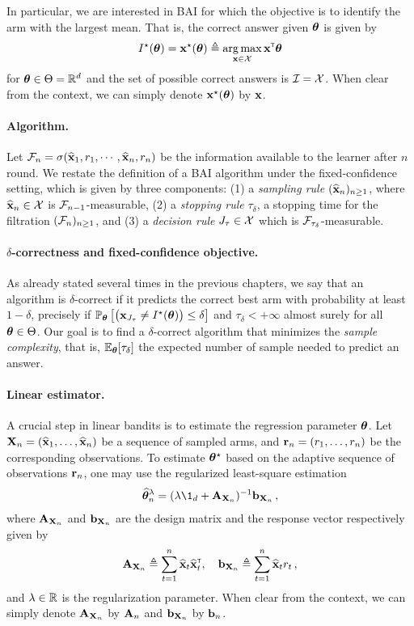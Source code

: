 In particular, we are interested in BAI for which the objective is to identify the arm with the largest mean. That is, the correct answer given ${\boldsymbol \theta}$ is given by 
\[
I^\star({\boldsymbol \theta}) = {\bf x}^\star({\boldsymbol \theta}) \triangleq \operatorname*{arg\,max}_{{\bf x}\in\mathcal{X}} {\bf x}^\mathsf{\scriptscriptstyle T}{\boldsymbol \theta}
\]
for ${\boldsymbol \theta}\in\Theta = \mathbb{R}^d$ and the set of possible correct answers is $\mathcal{I} = \mathcal{X}$. When clear from the context, we can simply denote ${\bf x}^\star({\boldsymbol \theta})$ by ${\bf x}$.

\paragraph{Algorithm.}
Let $\mathcal{F}_{n}=\sigma (\widehat{{\bf x}}_1,r_1,\cdots, \widehat{{\bf x}}_n,r_n)$ be the information available to the learner after $n$ round. We restate the definition of a BAI algorithm under the fixed-confidence setting, which is given by three components: (1) a \emph{sampling rule} $(\widehat{{\bf x}}_n)_{n\geq 1}$, where $\widehat{{\bf x}}_n\in\mathcal{X}$ is $\mathcal{F}_{n-1}$-measurable, (2) a \emph{stopping rule} $\tau_\delta$, a stopping time for the filtration $(\mathcal{F}_n)_{n\geq 1}$, and (3) a \emph{decision rule} $J_\tau\in \mathcal{X}$ which is $\mathcal{F}_{\tau_\delta}$-measurable.

\paragraph{$\delta$-correctness and fixed-confidence objective.}
As already stated several times in the previous chapters, we say that an algorithm is $\delta$-correct if it predicts the correct best arm with probability at least $1-\delta$, precisely if $\mathbb{P}_{\boldsymbol \theta}\left[\big({\bf x}_{J_\tau} \neq I^\star({\boldsymbol \theta})\big) \leq \delta\right]$ and $\tau_\delta < +\infty$ almost surely for all ${\boldsymbol \theta} \in\Theta$. Our goal is to find a $\delta$-correct algorithm that minimizes the \emph{sample complexity}, that is,  $\mathbb{E}_{\boldsymbol \theta}[\tau_\delta]$ the expected number of sample needed to predict an answer.

\paragraph{Linear estimator.}
A crucial step in linear bandits is to estimate the regression parameter ${\boldsymbol \theta}$. Let ${\bf X}_n=(\widehat{{\bf x}}_1,\ldots,\widehat{{\bf x}}_n)$ be a sequence of sampled arms, and ${\bf r}_n=(r_1,\ldots,r_n)$ be the corresponding observations. To estimate ${\boldsymbol \theta}^\star$ based on the adaptive sequence of observations ${\bf r}_n$, one may use the \gls{regularized least-square estimation}
\begin{align}\label{eq:update_mean}
    \hat{\btheta}_n^{\lambda} = (\lambda \1_d + \bA_{\bX_n})^{-1}\bb_{\bX_n}\,,
\end{align}
where ${\bf A}_{{\bf X}_n}$ and ${\bf b}_{{\bf X}_n}$ are the design matrix and the response vector respectively given by
\[
    {\bf A}_{{\bf X}_n} \triangleq \sum_{t=1}^n \widehat{{\bf x}}_t\widehat{{\bf x}}_t^\mathsf{\scriptscriptstyle T}, \quad {\bf b}_{{\bf X}_n} \triangleq \sum_{t=1}^n \widehat{{\bf x}}_t r_t\,,
\]
and $\lambda\in\mathbb{R}$ is the regularization parameter. When clear from the context, we can simply denote ${\bf A}_{{\bf X}_n}$ by ${\bf A}_n$ and ${\bf b}_{{\bf X}_n}$ by ${\bf b}_n$.

